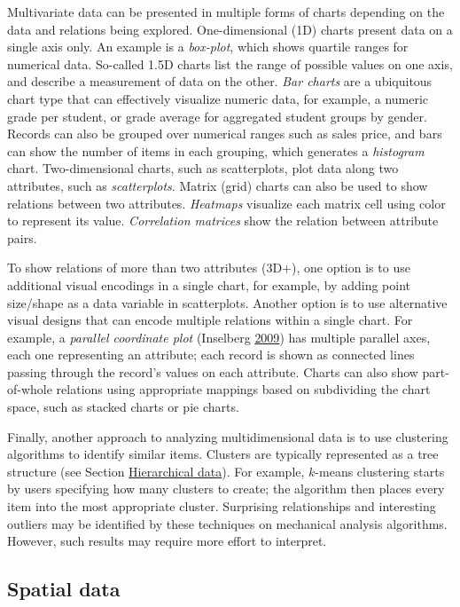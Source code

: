 \documentclass[]{krantz}
\begin{document}
Multivariate data can be presented in multiple forms of charts depending
on the data and relations being explored. One-dimensional (1D) charts
present data on a single axis only. An example is a \emph{box-plot},
which shows quartile ranges for numerical data. So-called 1.5D charts
list the range of possible values on one axis, and describe a
measurement of data on the other. \emph{Bar charts} are a ubiquitous
chart type that can effectively visualize numeric data, for example, a
numeric grade per student, or grade average for aggregated student
groups by gender. Records can also be grouped over numerical ranges such
as sales price, and bars can show the number of items in each grouping,
which generates a \emph{histogram} chart. Two-dimensional charts, such
as scatterplots, plot data along two attributes, such as
\emph{scatterplots}. Matrix (grid) charts can also be used to show
relations between two attributes. \emph{Heatmaps} visualize each matrix
cell using color to represent its value. \emph{Correlation matrices}
show the relation between attribute pairs.

To show relations of more than two attributes (3D+), one option is to
use additional visual encodings in a single chart, for example, by
adding point size/shape as a data variable in scatterplots. Another
option is to use alternative visual designs that can encode multiple
relations within a single chart. For example, a \emph{parallel
coordinate plot} (Inselberg \protect\hyperlink{ref-inselberg2009}{2009})
has multiple parallel axes, each one representing an attribute; each
record is shown as connected lines passing through the record's values
on each attribute. Charts can also show part-of-whole relations using
appropriate mappings based on subdividing the chart space, such as
stacked charts or pie charts.

Finally, another approach to analyzing multidimensional data is to use
clustering algorithms to identify similar items. Clusters are typically
represented as a tree structure (see Section
\protect\hyperlink{sec:viz-2.5}{Hierarchical data}). For example,
\(k\)-means clustering starts by users specifying how many clusters to
create; the algorithm then places every item into the most appropriate
cluster. Surprising relationships and interesting outliers may be
identified by these techniques on mechanical analysis algorithms.
However, such results may require more effort to interpret.

\subsection{Spatial data}\label{sec:viz-2.2}
\end{document}
